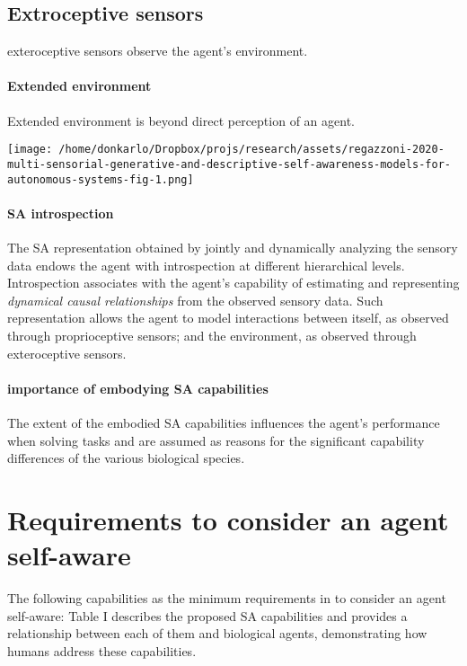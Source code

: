 \documentclass{article}
\begin{document}
		\subsection{Extroceptive sensors}
		exteroceptive sensors observe the agent's environment.
			\paragraph{Extended environment}
				Extended environment is beyond direct perception of an agent.
	\begin{figure*}
		\centering
		\texttt{[image: /home/donkarlo/Dropbox/projs/research/assets/regazzoni-2020-multi-sensorial-generative-and-descriptive-self-awareness-models-for-autonomous-systems-fig-1.png]}
		\caption{\citet{regazzoni-2020-multi-sensorial-generative-and-descriptive-self-awareness-models-for-autonomous-systems}}
		\label{fig:regazzoni-2020-multi-sensorial-generative-and-descriptive-self-awareness-models-for-autonomous-systems-fig-1.jpg}
	\end{figure*}
		
	\paragraph{SA introspection}  The SA representation obtained by jointly and dynamically analyzing the sensory data endows the agent with introspection at different hierarchical levels. Introspection associates with the agent’s capability of estimating and representing \emph{dynamical causal relationships} from the observed sensory data. Such representation allows the agent to model interactions between itself, as observed through proprioceptive sensors; and the environment, as observed through exteroceptive sensors.
		
	\paragraph{importance of embodying SA capabilities}The extent of the embodied SA capabilities influences the agent's performance when solving tasks and are assumed as reasons for the significant capability differences of the various biological species. 
		
		\section{Requirements to consider an agent self-aware}The following capabilities as the minimum requirements in to consider an agent self-aware:
			\citet{regazzoni-2020-multi-sensorial-generative-and-descriptive-self-awareness-models-for-autonomous-systems} Table I describes the proposed SA capabilities and provides a relationship between each of them and biological agents, demonstrating how humans address these capabilities.
\end{document}
